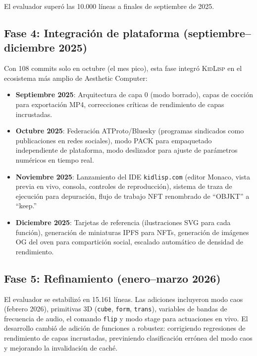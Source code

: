\documentclass[10pt,letterpaper,twocolumn]{article}
\newcommand{\kidlisp}{\textsc{KidLisp}}
\begin{document}
El evaluador superó las 10.000 líneas a finales de septiembre de 2025.

\subsection{Fase 4: Integración de plataforma (septiembre--diciembre 2025)}

Con 108 commits solo en octubre (el mes pico), esta fase integró \kidlisp{} en el ecosistema más amplio de Aesthetic Computer:

\begin{itemize}
  \item \textbf{Septiembre 2025}: Arquitectura de capa 0 (modo borrado), capas de cocción para exportación MP4, correcciones críticas de rendimiento de capas incrustadas.
  \item \textbf{Octubre 2025}: Federación ATProto/Bluesky (programas sindicados como publicaciones en redes sociales), modo PACK para empaquetado independiente de plataforma, modo deslizador para ajuste de parámetros numéricos en tiempo real.
  \item \textbf{Noviembre 2025}: Lanzamiento del IDE \texttt{kidlisp.com} (editor Monaco, vista previa en vivo, consola, controles de reproducción), sistema de traza de ejecución para depuración, flujo de trabajo NFT renombrado de ``OBJKT'' a ``keep.''
  \item \textbf{Diciembre 2025}: Tarjetas de referencia (ilustraciones SVG para cada función), generación de miniaturas IPFS para NFTs, generación de imágenes OG del oven para compartición social, escalado automático de densidad de rendimiento.
\end{itemize}

\subsection{Fase 5: Refinamiento (enero--marzo 2026)}

El evaluador se estabilizó en 15.161 líneas. Las adiciones incluyeron modo caos (febrero 2026), primitivas 3D (\texttt{cube}, \texttt{form}, \texttt{trans}), variables de bandas de frecuencia de audio, el comando \texttt{flip} y modo stage para actuaciones en vivo. El desarrollo cambió de adición de funciones a robustez: corrigiendo regresiones de rendimiento de capas incrustadas, previniendo clasificación errónea del modo caos y mejorando la invalidación de caché.
\end{document}
